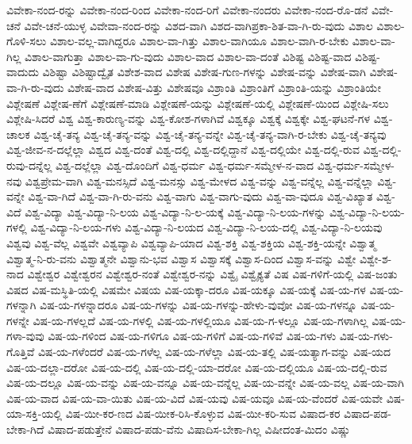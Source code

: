 {ವಿವೇಕಾ-ನಂದ-ರನ್ನು
ವಿವೇಕಾ-ನಂದ-ರಿಂದ
ವಿವೇಕಾ-ನಂದ-ರಿಗೆ
ವಿವೇಕಾ-ನಂದರು
ವಿವೇಕಾ-ನಂದ-ರೊ-ಡನೆ
ವಿವೇ-ಚನೆ
ವಿವೇ-ಚನೆ-ಯುಳ್ಳ
ವಿವೇವಾ-ನಂದ-ರನ್ನು
ವಿಶದ-ವಾಗಿ
ವಿಶದ-ವಾಗಿಪ್ರಕಾ-ಶಿತ-ವಾ-ಗಿ-ರು-ವುದು
ವಿಶಾಲ
ವಿಶಾಲ-ಗೊಳಿ-ಸಲು
ವಿಶಾಲ-ವಲ್ಲ-ವಾಗಿದ್ದರೂ
ವಿಶಾಲ-ವಾ-ಗಿತ್ತು
ವಿಶಾಲ-ವಾಗಿಯೂ
ವಿಶಾಲ-ವಾಗಿ-ರ-ಬೇಕು
ವಿಶಾಲ-ವಾ-ಗಿಲ್ಲ
ವಿಶಾಲ-ವಾಗುತ್ತಾ
ವಿಶಾಲ-ವಾ-ಗು-ವುದು
ವಿಶಾಲ-ವಾದ
ವಿಶಾಲ-ವಾ-ದಂತೆ
ವಿಶಿಷ್ಟ
ವಿಶಿಷ್ಟ-ವಾದ
ವಿಶಿಷ್ಟ-ವಾದುದು
ವಿಶಿಷ್ಟಾ
ವಿಶಿಷ್ಟಾದ್ವೈತ
ವಿಶೇಶ-ವಾದ
ವಿಶೇಷ
ವಿಶೇಷ-ಗುಣ-ಗಳನ್ನು
ವಿಶೇಷ-ವನ್ನು
ವಿಶೇಷ-ವಾಗಿ
ವಿಶೇಷ-ವಾ-ಗಿ-ರು-ವುದು
ವಿಶೇಷ-ವಾದ
ವಿಶೇಷ-ವಿತ್ತು
ವಿಶೇಷವೂ
ವಿಶ್ರಾಂತಿ
ವಿಶ್ರಾಂತಿಗೆ
ವಿಶ್ರಾಂತಿ-ಯನ್ನು
ವಿಶ್ರಾಂತಿಯೇ
ವಿಶ್ಲೇಷಣೆ
ವಿಶ್ಲೇಷ-ಣೆಗೆ
ವಿಶ್ಲೇಷಣೆ-ಮಾಡಿ
ವಿಶ್ಲೇಷಣೆ-ಯನ್ನು
ವಿಶ್ಲೇಷಣೆ-ಯಲ್ಲಿ
ವಿಶ್ಲೇಷಣೆ-ಯಿಂದ
ವಿಶ್ಲೇಷಿ-ಸಲು
ವಿಶ್ಲೇಷಿ-ಸಿದರೆ
ವಿಶ್ವ
ವಿಶ್ವ-ಕಾರುಣ್ಯ-ವನ್ನು
ವಿಶ್ವ-ಕೋಶ-ಗಳಾಗಿವೆ
ವಿಶ್ವಕ್ಕೂ
ವಿಶ್ವಕ್ಕೆ
ವಿಶ್ವಕ್ಕೇ
ವಿಶ್ವ-ಘಟನೆ-ಗಳ
ವಿಶ್ವ-ಚಾಲಕ
ವಿಶ್ವ-ಚೈ-ತನ್ಯ
ವಿಶ್ವ-ಚೈ-ತನ್ಯ-ವನ್ನು
ವಿಶ್ವ-ಚೈ-ತನ್ಯ-ವನ್ನೇ
ವಿಶ್ವ-ಚೈ-ತನ್ಯ-ವಾಗಿ-ರ-ಬೇಕು
ವಿಶ್ವ-ಚೈ-ತನ್ಯವು
ವಿಶ್ವ-ಜೀವ-ನ-ದಲ್ಲೆಲ್ಲಾ
ವಿಶ್ವದ
ವಿಶ್ವ-ದಂತೆ
ವಿಶ್ವ-ದಲ್ಲಿ
ವಿಶ್ವ-ದಲ್ಲಿದ್ದಾನೆ
ವಿಶ್ವ-ದಲ್ಲಿಯೇ
ವಿಶ್ವ-ದಲ್ಲಿ-ರುವ
ವಿಶ್ವ-ದಲ್ಲಿ-ರುವು-ದನ್ನೆಲ್ಲ
ವಿಶ್ವ-ದಲ್ಲೆಲ್ಲಾ
ವಿಶ್ವ-ದೊಂದಿಗೆ
ವಿಶ್ವ-ಧರ್ಮ
ವಿಶ್ವ-ಧರ್ಮ-ಸಮ್ಮೇಳ-ನ-ವಾದ
ವಿಶ್ವ-ಧರ್ಮ-ಸಮ್ಮೇಳ-ನವು
ವಿಶ್ವಪ್ರೇಮ-ವಾಗಿ
ವಿಶ್ವ-ಮನಸ್ಸಿದೆ
ವಿಶ್ವ-ಮನಸ್ಸು
ವಿಶ್ವ-ಮೇಳದ
ವಿಶ್ವ-ವನ್ನು
ವಿಶ್ವ-ವನ್ನೆಲ್ಲ
ವಿಶ್ವ-ವನ್ನೆಲ್ಲಾ
ವಿಶ್ವ-ವನ್ನೇ
ವಿಶ್ವ-ವಾ-ಗಿದೆ
ವಿಶ್ವ-ವಾ-ಗಿ-ರು-ವನು
ವಿಶ್ವ-ವಾಗು
ವಿಶ್ವ-ವಾಗು-ವುದು
ವಿಶ್ವ-ವಾ-ವುದೂ
ವಿಶ್ವ-ವಿಖ್ಯಾತ
ವಿಶ್ವ-ವಿದೆ
ವಿಶ್ವ-ವಿದ್ಯಾ
ವಿಶ್ವ-ವಿದ್ಯಾ-ನಿ-ಲಯ
ವಿಶ್ವ-ವಿದ್ಯಾ-ನಿ-ಲ-ಯಕ್ಕೆ
ವಿಶ್ವ-ವಿದ್ಯಾ-ನಿ-ಲಯ-ಗಳನ್ನು
ವಿಶ್ವ-ವಿದ್ಯಾ-ನಿ-ಲಯ-ಗಳಲ್ಲಿ
ವಿಶ್ವ-ವಿದ್ಯಾ-ನಿ-ಲಯ-ಗಳು
ವಿಶ್ವ-ವಿದ್ಯಾ-ನಿ-ಲಯದ
ವಿಶ್ವ-ವಿದ್ಯಾ-ನಿ-ಲಯ-ದಲ್ಲಿ
ವಿಶ್ವ-ವಿದ್ಯಾ-ನಿ-ಲಯವು
ವಿಶ್ವವು
ವಿಶ್ವ-ವೆಲ್ಲ
ವಿಶ್ವವೇ
ವಿಶ್ವವ್ಯಾಪಿ
ವಿಶ್ವವ್ಯಾಪಿ-ಯಾದ
ವಿಶ್ವ-ಶಕ್ತಿ
ವಿಶ್ವ-ಶಕ್ತಿಯ
ವಿಶ್ವ-ಶಕ್ತಿ-ಯನ್ನೇ
ವಿಶ್ವಾತ್ಮ
ವಿಶ್ವಾತ್ಮ-ನಿ-ರು-ವನು
ವಿಶ್ವಾತ್ಮನೇ
ವಿಶ್ವಾನು-ಭವ
ವಿಶ್ವಾಸ
ವಿಶ್ವಾಸಕ್ಕೆ
ವಿಶ್ವಾಸ-ದಿಂದ
ವಿಶ್ವಾಸ-ವನ್ನು
ವಿಶ್ವೇ
ವಿಶ್ವೇ-ಶ-ನಾದ
ವಿಶ್ವೇಶ್ವರ
ವಿಶ್ವೇಶ್ವರನ
ವಿಶ್ವೇಶ್ವರ-ನಂತೆ
ವಿಶ್ವೇಶ್ವರ-ನನ್ನು
ವಿಶ್ವೈ
ವಿಶ್ವೈಕ್ಯತೆ
ವಿಷ
ವಿಷ-ಗಳಿಗೆ-ಯಲ್ಲಿ
ವಿಷ-ಜಂತು
ವಿಷದ
ವಿಷ-ಮಸ್ಥಿತಿ-ಯಲ್ಲಿ
ವಿಷಮೇ
ವಿಷಯ
ವಿಷ-ಯಕ್ಕಾ-ದರೂ
ವಿಷ-ಯಕ್ಕೂ
ವಿಷ-ಯಕ್ಕೆ
ವಿಷ-ಯ-ಗಳ
ವಿಷ-ಯ-ಗಳನ್ನಾಗಿ
ವಿಷ-ಯ-ಗಳನ್ನಾದರೂ
ವಿಷ-ಯ-ಗಳನ್ನು
ವಿಷ-ಯ-ಗಳನ್ನು-ಹೇಳು-ವುವೋ
ವಿಷ-ಯ-ಗಳನ್ನೂ
ವಿಷ-ಯ-ಗಳನ್ನೇ
ವಿಷ-ಯ-ಗಳಲ್ಲದೆ
ವಿಷ-ಯ-ಗಳಲ್ಲಿ
ವಿಷ-ಯ-ಗಳಲ್ಲಿಯೂ
ವಿಷ-ಯ-ಗ-ಳಲ್ಲೂ
ವಿಷ-ಯ-ಗಳಾಗಿಲ್ಲ
ವಿಷ-ಯ-ಗಳಾ-ವುವು
ವಿಷ-ಯ-ಗಳಿಂದ
ವಿಷ-ಯ-ಗಳಿಗೂ
ವಿಷ-ಯ-ಗಳಿಗೆ
ವಿಷ-ಯ-ಗಳಿವೆ
ವಿಷ-ಯ-ಗಳು
ವಿಷ-ಯ-ಗಳು-ಗೊತ್ತಿವೆ
ವಿಷ-ಯ-ಗಳೆಂದರೆ
ವಿಷ-ಯ-ಗಳೆಲ್ಲ
ವಿಷ-ಯ-ಗಳೆಲ್ಲಾ
ವಿಷ-ಯ-ತಲ್ಲಿ
ವಿಷ-ಯತ್ಯಾಗ-ವನ್ನು
ವಿಷ-ಯದ
ವಿಷ-ಯ-ದಲ್ಲಾ-ದರೋ
ವಿಷ-ಯ-ದಲ್ಲಿ
ವಿಷ-ಯ-ದಲ್ಲಿ-ಯಾ-ದರೋ
ವಿಷ-ಯ-ದಲ್ಲಿಯೂ
ವಿಷ-ಯ-ದಲ್ಲಿ-ರುವ
ವಿಷ-ಯ-ದಲ್ಲೂ
ವಿಷ-ಯ-ವನ್ನು
ವಿಷ-ಯ-ವನ್ನೂ
ವಿಷ-ಯ-ವನ್ನೆಲ್ಲ
ವಿಷ-ಯ-ವನ್ನೇ
ವಿಷ-ಯ-ವಲ್ಲ
ವಿಷ-ಯ-ವಾಗಿ
ವಿಷ-ಯ-ವಾದ
ವಿಷ-ಯ-ವಾ-ಯಿತು
ವಿಷ-ಯ-ವಿದೆ
ವಿಷ-ಯವು
ವಿಷ-ಯವೂ
ವಿಷ-ಯ-ವೆಂದರೆ
ವಿಷ-ಯವೇ
ವಿಷ-ಯಾ-ಸಕ್ತಿ-ಯಲ್ಲಿ
ವಿಷ-ಯೀ-ಕರ-ಣದ
ವಿಷ-ಯೀಕ-ರಿಸಿ-ಕೊಳ್ಳುವ
ವಿಷ-ಯೀ-ಕರಿ-ಸುವ
ವಿಷಾದ-ಕರ
ವಿಷಾದ-ಪಡ-ಬೇಕಾ-ಗಿದೆ
ವಿಷಾದ-ಪಡುತ್ತೇನೆ
ವಿಷಾದ-ಪಡು-ವೆನು
ವಿಷಾದಿಸ-ಬೇಕಾ-ಗಿಲ್ಲ
ವಿಷೀದಂತ-ಮಿದಂ
ವಿಷ್ಣು
}
